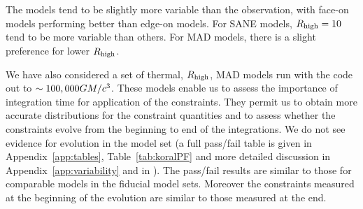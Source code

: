 

The models tend to be slightly more variable than the observation, with face-on models performing better than edge-on models. For SANE models, $R_\mathrm{high} = 10$ tend to be more variable than others. For MAD models, there is a slight preference for lower $R_\mathrm{high}$.

We have also considered a set of thermal, $R_\mathrm{high}$, MAD models run with the \koral code out to $\sim 100,000GM/c^3$.  These models enable us to assess the importance of integration time for application of the constraints.  They permit us to obtain more accurate distributions for the constraint quantities and to assess whether the constraints evolve from the beginning to end of the integrations. We do not see evidence for evolution in the \koral model set (a full pass/fail table is given in Appendix~\ref{app:tables}, Table~\ref{tab:koralPF} and more detailed discussion in Appendix~\ref{app:variability} and in \citet{Georgiev_2022}). The \koral pass/fail results are similar to those for comparable models in the fiducial model sets. Moreover the constraints measured at the beginning of the evolution are similar to those measured at the end.

